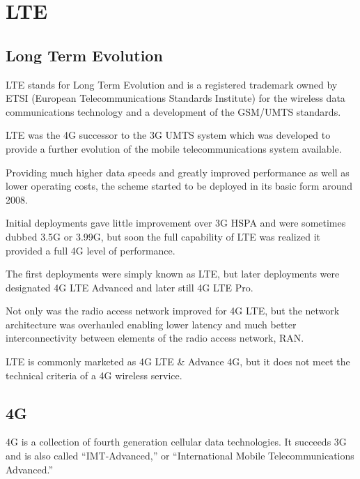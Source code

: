 %	
%
%



\section{LTE}
\subsection{Long Term Evolution}
LTE stands for Long Term Evolution and is a registered trademark owned by ETSI (European Telecommunications Standards Institute) for the wireless data communications technology and a development of the GSM/UMTS standards.

LTE was the 4G successor to the 3G UMTS system which was developed to provide a further evolution of the mobile telecommunications system available.

Providing much higher data speeds and greatly improved performance as well as lower operating costs, the scheme started to be deployed in its basic form around 2008.

Initial deployments gave little improvement over 3G HSPA and were sometimes dubbed 3.5G or 3.99G, but soon the full capability of LTE was realized it provided a full 4G level of performance.

The first deployments were simply known as LTE, but later deployments were designated 4G LTE Advanced and later still 4G LTE Pro.

Not only was the radio access network improved for 4G LTE, but the network architecture was overhauled enabling lower latency and much better interconnectivity between elements of the radio access network, RAN.


LTE is commonly marketed as 4G LTE \& Advance 4G, but it does not meet the technical criteria of a 4G wireless service.	

\subsection{4G}
4G is a collection of fourth generation cellular data technologies. It succeeds 3G and is also called “IMT-Advanced,” or “International Mobile Telecommunications Advanced.”

